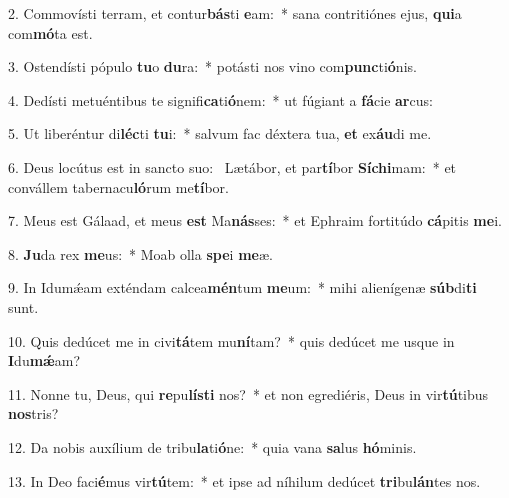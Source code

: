 2. Commovísti terram, et contur\textbf{bás}ti \textbf{e}am:~*  sana contritiónes ejus, \textbf{qui}a com\textbf{mó}ta est.\

3. Ostendísti pópulo \textbf{tu}o \textbf{du}ra:~*  potásti nos vino com\textbf{punc}ti\textbf{ó}nis.\

4. Dedísti metuéntibus te signifi\textbf{ca}ti\textbf{ó}nem:~*  ut fúgiant a \textbf{fá}cie \textbf{ar}cus:\

5. Ut liberéntur di\textbf{léc}ti \textbf{tu}i:~*  salvum fac déxtera tua, \textbf{et} ex\textbf{áu}di me.\

6. Deus locútus est in sancto suo: \dag\  Lætábor, et par\textbf{tí}bor \textbf{Sí}\textbf{chi}mam:~*  et convállem tabernacu\textbf{ló}rum me\textbf{tí}bor.\

7. Meus est Gálaad, et meus \textbf{est} Ma\textbf{nás}ses:~*  et Ephraim fortitúdo \textbf{cá}pitis \textbf{me}i.\

8. \textbf{Ju}da rex \textbf{me}us:~*  Moab olla \textbf{spe}i \textbf{me}æ.\

9. In Idumǽam exténdam calcea\textbf{mén}tum \textbf{me}um:~*  mihi alienígenæ \textbf{súb}di\textbf{ti} sunt.\

10. Quis dedúcet me in civi\textbf{tá}tem mu\textbf{ní}tam?~*  quis dedúcet me usque in \textbf{I}du\textbf{mǽ}am?\

11. Nonne tu, Deus, qui \textbf{re}pu\textbf{lís}\textbf{ti} nos?~*  et non egrediéris, Deus in vir\textbf{tú}tibus \textbf{nos}tris?\

12. Da nobis auxílium de tribu\textbf{la}ti\textbf{ó}ne:~*  quia vana \textbf{sa}lus \textbf{hó}minis.\

13. In Deo faci\textbf{é}mus vir\textbf{tú}tem:~*  et ipse ad níhilum dedúcet \textbf{tri}bu\textbf{lán}tes nos.\

